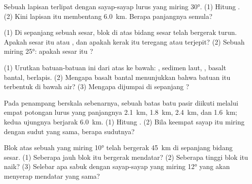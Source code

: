 \begin{exercise}[$\star$]\label{exo:g12:mountain-building:3}
Sebuah lapisan terlipat dengan sayap-sayap lurus yang miring \ang{30}.
(1) Hitung . (2) Kini lapisan itu membentang \qty{6.0}{km}. Berapa
panjangnya semula?
\end{exercise}

\begin{exercise}[$\star$]\label{exo:g12:mountain-building:4}
(1) Di sepanjang sebuah sesar, blok di atas bidang sesar telah bergerak turun.
Apakah sesar itu  atau , dan apakah kerak itu teregang
atau terjepit? (2) Sebuah  miring \ang{25}: apakah sesar itu ?
\end{exercise}

\begin{exercise}[$\star$]\label{exo:g12:mountain-building:5}
(1) Urutkan batuan-batuan  ini dari atas ke bawah: , sedimen laut,
, basalt bantal,  berlapis. (2) Mengapa basalt bantal
menunjukkan bahwa batuan itu terbentuk di bawah air? (3) Mengapa 
dijumpai di sepanjang ?
\end{exercise}

\begin{exercise}[$\star\star$]\label{exo:g12:mountain-building:6}
Pada penampang berskala sebenarnya, sebuah batas batu pasir diikuti melalui
empat potongan lurus yang panjangnya \qty{2.1}{km}, \qty{1.8}{km},
\qty{2.4}{km}, dan \qty{1.6}{km}; kedua ujungnya berjarak \qty{6.0}{km}.
(1) Hitung . (2) Bila keempat sayap itu miring dengan sudut yang
sama, berapa sudutnya?
\end{exercise}

\begin{exercise}[$\star\star$]\label{exo:g12:mountain-building:7}
Blok atas sebuah  yang miring \ang{10} telah bergerak \qty{45}{km}
di sepanjang bidang sesar. (1) Seberapa jauh blok itu bergerak mendatar?
(2) Seberapa tinggi blok itu naik? (3) Selebar apa sabuk  dengan
sayap-sayap yang miring \ang{12} yang akan menyerap  mendatar yang
sama?
\end{exercise}

